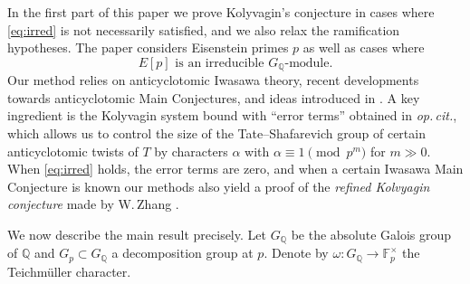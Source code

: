 \documentclass[10pt,reqno]{amsart}
\numberwithin{equation}{section}
\theoremstyle{plain}
\theoremstyle{definition}
\theoremstyle{definition}
\theoremstyle{plain}
\theoremstyle{plain}
\theoremstyle{plain}
\theoremstyle{plain}
\theoremstyle{plain}
\theoremstyle{plain}
\newcommand{\Q}{\mathbb{Q}}
\newcommand{\sk}{\vspace{0.1in}}
\begin{document}
In the first part of this paper we prove Kolyvagin's conjecture in cases where \eqref{eq:irred} is not necessarily satisfied, and we also relax the ramification hypotheses. The paper considers Eisenstein primes $p$ as well as cases where
\begin{equation}\label{eq:irr}
\tag{irr}
\text{$E[p]$ is an irreducible $G_\Q$-module.}
\end{equation}
Our method relies on anticyclotomic Iwasawa theory, recent developments towards anticyclotomic Main Conjectures, and ideas 
 introduced in \cite{eisenstein_cyc}. %
A key ingredient is 
the Kolyvagin system bound with ``error terms'' obtained in \emph{op.\,cit.}, which allows us to control the size of the Tate--Shafarevich group of certain anticyclotomic twists of $T$ %
by characters $\alpha$ with $\alpha\equiv 1\pmod{p^m}$ for $m\gg 0$. 
When \eqref{eq:irred} holds, the error terms are zero,
and when a certain Iwasawa Main Conjecture is known our methods also yield a proof of the \emph{refined Kolvyagin conjecture} made by W.\,Zhang \cite[Conj.~4.5]{zhang-CDM}.
%
\sk

We now describe the main result
 precisely. %
Let 
$G_{\Q}$ be the absolute Galois group of $\Q$ and 
$G_p\subset G_\Q$ a decomposition group at $p$. 
Denote by $\omega:G_\Q\rightarrow\mathbb{F}_p^\times$ the Teichm\"{u}ller character. 
%
\end{document}
